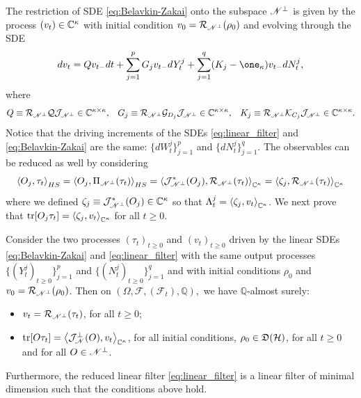 \documentclass[aihp,12pt]{imsart}
\begin{document}
The restriction of SDE \eqref{eq:Belavkin-Zakai} onto the subspace $\mathscr{N}^\perp$ is given by the process $(v_t)\in\mathbb{C}^\kappa$ with initial condition $v_0=\mathcal{R}_{\mathscr{N}^\perp}(\rho_0)$ and evolving through the SDE
\begin{equation}
        dv_t = Q v_{t-} dt + \sum_{j=1}^p G_j v_{t-} dY_t^j + \sum_{j=1}^q (K_j-\one_\kappa) v_{t-} dN_t^j,
    \label{eq:linear_filter}
\end{equation}
where 
\begin{align}
    Q \equiv \mathcal{R}_{\mathscr{N}^\perp} {\mathcal{Q}}\mathcal{J}_{\mathscr{N}^\perp}\in\mathbb{C}^{\kappa \times \kappa}, && 
    G_j \equiv \mathcal{R}_{\mathscr{N}^\perp}\mathcal{G}_{D_j}\mathcal{J}_{\mathscr{N}^\perp}\in\mathbb{C}^{\kappa \times \kappa}, && 
    K_j \equiv \mathcal{R}_{\mathscr{N}^\perp}\mathcal{K}_{C_j}\mathcal{J}_{\mathscr{N}^\perp}\in\mathbb{C}^{\kappa \times \kappa}.
    \label{eq:reduced_op_linear}
\end{align}
Notice that the driving increments of the SDEs \eqref{eq:linear_filter} and \eqref{eq:Belavkin-Zakai} are the same: $\{dW_t^j\}_{j=1}^p$ and $\{dN_t^j\}_{j=1}^{q}$. 
The observables can be reduced as well by considering \[\left< O_j,\tau_t \right>_{HS} = \left< O_j,\Pi_{\mathscr{N}^\perp}(\tau_t) \right>_{HS} = \left< \mathcal{J}_{\mathscr{N}^\perp}^*(O_j),\mathcal{R}_{\mathscr{N}^\perp}(\tau_t) \right>_{\mathbb{C}^\kappa} =  \left< \zeta_j,\mathcal{R}_{\mathscr{N}^\perp}(\tau_t) \right>_{\mathbb{C}^\kappa}\]
where we defined $\zeta_j \equiv \mathcal{J}_{\mathscr{N}^\perp}^*(O_j)\in\mathbb{C}^\kappa$ so that $\Lambda_t^j=\left< \zeta_j,v_{t} \right>_{\mathbb{C}^\kappa}$.
We next prove that ${\rm tr}[O_j\tau_t] = \left< \zeta_j,v_t \right>_{\mathbb{C}^\kappa}$ for all $t\geq0$.
\begin{theorem}
\label{thm:linear_filter_reduction}
    Consider the two processes $(\tau_t)_{t\geq0}$ and $(v_t)_{t\geq0}$ driven by the linear SDEs \eqref{eq:Belavkin-Zakai} and \eqref{eq:linear_filter} with the same output processes $\{(Y_t^j)_{t\geq0}\}_{j=1}^p$ and $\{(N_t^j)_{t\geq0}\}_{j=1}^q$ and with initial conditions $\rho_0$ and $v_0=\mathcal{R}_{\mathscr{N}^\perp}(\rho_0)$. Then on $(\Omega,\mathcal F,(\mathcal F_t),\mathbb Q),$ we have $\mathbb{Q}$-almost surely:
    \begin{itemize}
        \item $v_t=\mathcal{R}_{\mathscr{N}^\perp}(\tau_t)$, for all $t\geq0$;
        \item ${\rm tr}[O\tau_t] = \left< \mathcal{J}_{\mathscr{N}}^\perp(O),v_t \right>_{\mathbb{C}^\kappa}$, for all initial conditions, $\rho_0\in\mathfrak{D}(\mathcal{H})$, for all $t\geq0$ and for all $O\in\mathscr{N}^\perp$. 
    \end{itemize} 

    Furthermore, the reduced linear filter \eqref{eq:linear_filter} is a linear filter of minimal dimension such that the  conditions above hold.
\end{theorem}
\end{document}
